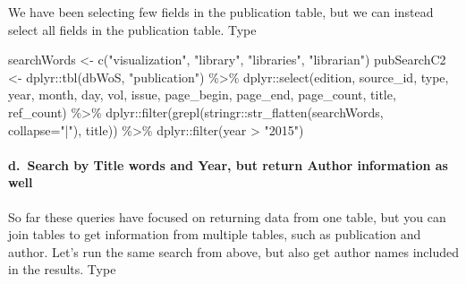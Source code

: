\documentclass[
]{article}
\newenvironment{Shaded}{\begin{snugshade}}{\end{snugshade}}
\newcommand{\AttributeTok}[1]{\textcolor[rgb]{0.77,0.63,0.00}{#1}}
\newcommand{\FunctionTok}[1]{\textcolor[rgb]{0.00,0.00,0.00}{#1}}
\newcommand{\NormalTok}[1]{#1}
\newcommand{\OtherTok}[1]{\textcolor[rgb]{0.56,0.35,0.01}{#1}}
\newcommand{\SpecialCharTok}[1]{\textcolor[rgb]{0.00,0.00,0.00}{#1}}
\newcommand{\StringTok}[1]{\textcolor[rgb]{0.31,0.60,0.02}{#1}}
\begin{document}
We have been selecting few fields in the publication table, but we can
instead select all fields in the publication table. Type

\begin{Shaded}
\begin{Highlighting}[]
\NormalTok{searchWords }\OtherTok{\textless{}{-}} \FunctionTok{c}\NormalTok{(}\StringTok{"visualization"}\NormalTok{, }\StringTok{"library"}\NormalTok{, }\StringTok{"libraries"}\NormalTok{, }\StringTok{"librarian"}\NormalTok{)}
\NormalTok{pubSearchC2 }\OtherTok{\textless{}{-}}\NormalTok{ dplyr}\SpecialCharTok{::}\FunctionTok{tbl}\NormalTok{(dbWoS, }\StringTok{"publication"}\NormalTok{) }\SpecialCharTok{\%\textgreater{}\%}
\NormalTok{  dplyr}\SpecialCharTok{::}\FunctionTok{select}\NormalTok{(edition, source\_id, type, year, month, day, vol,}
\NormalTok{                issue, page\_begin, page\_end, page\_count, title, ref\_count) }\SpecialCharTok{\%\textgreater{}\%}
\NormalTok{  dplyr}\SpecialCharTok{::}\FunctionTok{filter}\NormalTok{(}\FunctionTok{grepl}\NormalTok{(stringr}\SpecialCharTok{::}\FunctionTok{str\_flatten}\NormalTok{(searchWords, }\AttributeTok{collapse=}\StringTok{"|"}\NormalTok{), title)) }\SpecialCharTok{\%\textgreater{}\%}
\NormalTok{  dplyr}\SpecialCharTok{::}\FunctionTok{filter}\NormalTok{(year }\SpecialCharTok{\textgreater{}} \StringTok{"2015"}\NormalTok{)}
\end{Highlighting}
\end{Shaded}

\hypertarget{d.-search-by-title-words-and-year-but-return-author-information-as-well}{%
\paragraph{d.~Search by Title words and Year, but return Author
information as
well}\label{d.-search-by-title-words-and-year-but-return-author-information-as-well}}

So far these queries have focused on returning data from one table, but
you can join tables to get information from multiple tables, such as
publication and author. Let's run the same search from above, but also
get author names included in the results. Type
\end{document}
